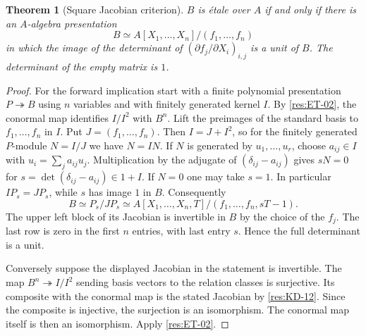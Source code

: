 \documentclass[11pt,oneside,openany]{book}
\newtheorem{theorem}{Theorem}[chapter]
\theoremstyle{definition}
\theoremstyle{remark}
\begin{document}
\begin{theorem}[Square Jacobian criterion]\label{res:ET-03}
$B$ is \'{e}tale over $A$ if and only if there is an $A$-algebra
presentation
\[
  B\simeq A[X_1,\ldots,X_n]/(f_1,\ldots,f_n)
\]
in which the image of the determinant of
$(\partial f_j/\partial X_i)_{i,j}$ is a unit of $B$.
The determinant of the empty matrix is $1$.
\end{theorem}
\begin{proof}
For the forward implication start with a finite polynomial presentation
$P\twoheadrightarrow B$ using $n$ variables and with finitely generated
kernel $I$. By \ref{res:ET-02}, the conormal map identifies $I/I^2$
with $B^n$. Lift the preimages of the standard basis to $f_1,\ldots,f_n$
in $I$. Put $J=(f_1,\ldots,f_n)$. Then $I=J+I^2$, so for the
finitely generated $P$-module $N=I/J$ we have $N=IN$.
If $N$ is generated by $u_1,\ldots,u_r$, choose $a_{ij}\in I$ with
$u_i=\sum_j a_{ij}u_j$. Multiplication by the adjugate of
$(\delta_{ij}-a_{ij})$ gives $sN=0$ for
$s=\det(\delta_{ij}-a_{ij})\in1+I$. If $N=0$ one may take $s=1$.
In particular $I P_s=J P_s$, while $s$ has image $1$ in $B$.
Consequently
\[
 B\simeq P_s/JP_s
   \simeq A[X_1,\ldots,X_n,T]/(f_1,\ldots,f_n,sT-1).
\]
The upper left block of its Jacobian is invertible in $B$ by the choice
of the $f_j$. The last row is zero in the first $n$ entries, with last
entry $s$. Hence the full determinant is a unit.

Conversely suppose the displayed Jacobian in the statement is invertible.
The map $B^n\twoheadrightarrow I/I^2$ sending basis vectors to the
relation classes is surjective. Its composite with the conormal map
is the stated Jacobian by \ref{res:KD-12}. Since the composite is
injective, the surjection is an isomorphism. The conormal map itself
is then an isomorphism. Apply \ref{res:ET-02}.
\end{proof}
\end{document}

